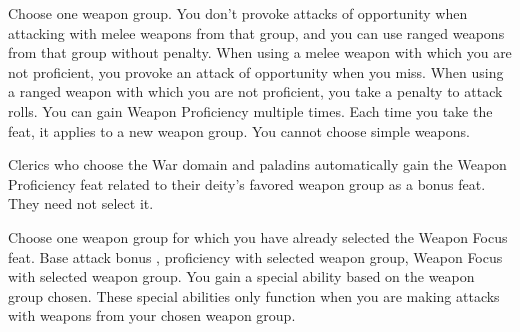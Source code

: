 Choose one weapon group.
 You don't provoke attacks of opportunity when attacking with melee weapons from that group, and you can use ranged weapons from that group without penalty.
 When using a melee weapon with which you are not proficient, you provoke an attack of opportunity when you miss. When using a ranged weapon with which you are not proficient, you take a  penalty to attack rolls.
 You can gain Weapon Proficiency multiple times. Each time you take the feat, it applies to a new weapon group. You cannot choose simple weapons.
\par Clerics who choose the War domain and paladins automatically gain the Weapon Proficiency feat related to their deity's favored weapon group as a bonus feat. They need not select it.

Choose one weapon group for which you have already selected the Weapon Focus feat.
 Base attack bonus , proficiency with selected weapon group, Weapon Focus with selected weapon group.
\featben You gain a special ability based on the weapon group chosen. These special abilities only function when you are making attacks with weapons from your chosen weapon group.

